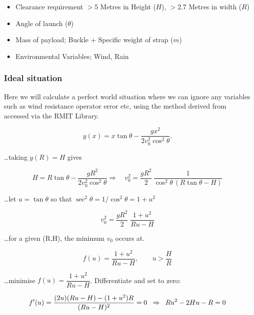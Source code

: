 \documentclass[a4paper,10pt]{article} %
\begin{document}
\begin{itemize}
    \item Clearance requirement $>$5 Metres in Height ($H$), $>$2.7 Metres in width ($R$)
    \item Angle of launch ($\theta$)
    \item Mass of payload; Buckle + Specific weight of strap ($m$)
    \item Environmental Variables; Wind, Rain
\end{itemize}

\subsubsection{Ideal situation}

Here we will calculate a perfect world situation where we can ignore any variables such as wind resistance operator error etc, using the method derived from \parencite{MunganCarlE.2017OtLo} accessed via the RMIT Library.

\begin{equation}
y(x)=x\tan\theta-\frac{g x^{2}}{2 v_0^{2}\cos^{2}\theta}.
\end{equation}

\ldots taking \(y(R)=H\) gives

\begin{equation*}
H = R\tan\theta-\frac{g R^{2}}{2 v_0^{2}\cos^{2}\theta}
\Rightarrow\quad
v_0^{2} = \frac{g R^{2}}{2}\,\frac{1}{\cos^{2}\theta\,(R\tan\theta-H)}
\end{equation*}

\ldots let \(u=\tan\theta\) so that \(\sec^{2}\theta=1/\cos^{2}\theta=1+u^{2}\)

\begin{equation*}
v_0^{2}=\frac{g R^{2}}{2}\;\frac{1+u^{2}}{R u - H}
\end{equation*}

\ldots for a given (R,H), the minimum $v_0$ occurs at.

\begin{equation*}
    f(u) = \frac{1 + u^2}{Ru-H}, \qquad u>\frac{H}{R}
\end{equation*}

\ldots minimise \(f(u)=\dfrac{1+u^{2}}{R u - H}\). Differentiate and set to zero:

\medskip

\begin{equation*}
    f'(u)=\frac{(2u)(Ru-H)-(1+u^{2})R}{(Ru-H)^{2}}=0
    \;\;\Rightarrow\;\; Ru^{2}-2Hu-R=0 \\
\end{equation*}
\end{document}
